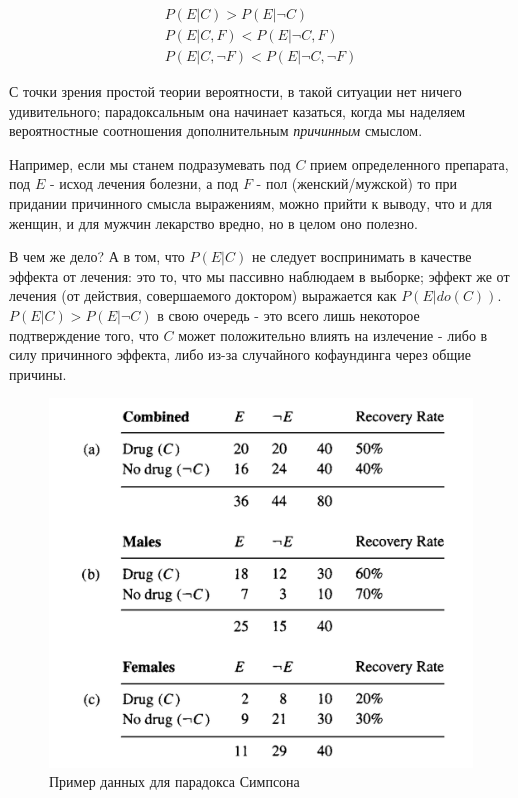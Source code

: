 \documentclass[fleqn]{article}
\numberwithin{equation}{section}
\numberwithin{theorem}{section}
\numberwithin{figure}{section}
\numberwithin{lemma}{section}
\numberwithin{corollary}{section}
\begin{document}
\begin{align}
	P(E|C) > P(E|\neg C) \label{eq:simpson1} \\
	P(E|C,F) < P(E|\neg C, F) \label{eq:simpson2} \\
	P(E|C,\neg F) < P(E| \neg C, \neg F) \label{eq:simpson3}
\end{align}

С точки зрения простой теории вероятности, в такой ситуации нет ничего удивительного; парадоксальным она начинает казаться, когда мы наделяем вероятностные соотношения дополнительным \textit{причинным} смыслом.

Например, если мы станем подразумевать под $C$ прием определенного препарата, под $E$ - исход лечения болезни, а под $F$ - пол (женский/мужской) то при придании причинного смысла выражениям, можно прийти к выводу, что и для женщин, и для мужчин лекарство вредно, но в целом оно полезно. 

В чем же дело? А в том, что $P(E|C)$ не следует воспринимать в качестве эффекта от лечения: это то, что мы пассивно наблюдаем в выборке; эффект же от лечения (от действия, совершаемого доктором) выражается как $P(E|do(C))$. $P(E|C) > P(E|\neg C)$ в свою очередь - это всего лишь некоторое подтверждение того, что $C$ может положительно влиять на излечение - либо в силу причинного эффекта, либо из-за случайного кофаундинга через общие причины.

\begin{figure}[h]
	\begin{center}
		\includegraphics[scale=0.5]{imgs/img28.png}
	\end{center}
	\caption{Пример данных для парадокса Симпсона}
	\label{fig:simpson}
\end{figure}
\end{document}
